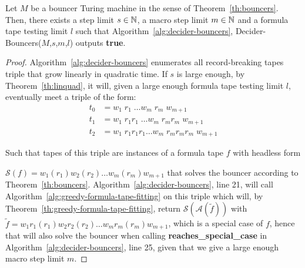 \begin{theorem}
    Let $M$ be a bouncer Turing machine in the sense of Theorem~\ref{th:bouncers}. Then, there exists a step limit $s\in\mathbb{N}$, a macro step limit $m\in\mathbb{N}$ and a formula tape testing limit $l$ such that Algorithm~\ref{alg:decider-bouncers}, {\sc Decider-Bouncers}($M$,$s$,$m$,$l$) outputs \textbf{true}.
\end{theorem}
\begin{proof}

    Algorithm~\ref{alg:decider-bouncers} enumerates all record-breaking tapes triple that grow linearly in quadratic time. If $s$ is large enough, by Theorem~\ref{th:linquad}, it will, given a large enough formula tape testing limit $l$, eventually meet a triple of the form:
    \begin{align*}
        t_0 & = w_1\; r_1\; \dots w_m\; r_m\; w_{m+1}               \\
        t_1 & = w_1\; r_1r_1\; \dots w_m\; r_m r_m\; w_{m+1}        \\
        t_2 & = w_1\; r_1 r_1 r_1 \dots w_m\; r_m r_m r_m\; w_{m+1}
    \end{align*}

    Such that tapes of this triple are instances of a formula tape $f$ with headless form

    $\mathcal{S}(f) = w_1 (r_1) w_2 (r_2) \dots w_m (r_m) w_{m+1} $ that solves the bouncer according to Theorem~\ref{th:bouncers}. Algorithm~\ref{alg:decider-bouncers}, line 21, will call Algorithm~\ref{alg:greedy-formula-tape-fitting} on this triple which will, by Theorem~\ref{th:greedy-formula-tape-fitting}, return $\mathcal{S}(\mathcal{A}(\tilde{f}))$ with $\tilde{f}=  w_1 r_1(r_1) w_2 r_2(r_2) \dots w_m r_m(r_m) w_{m+1}$, which is a special case of $f$, hence that will also solve the bouncer when calling \textbf{reaches\_special\_case} in Algorithm~\ref{alg:decider-bouncers}, line 25, given that we give a large enough macro step limit $m$.
\end{proof}







